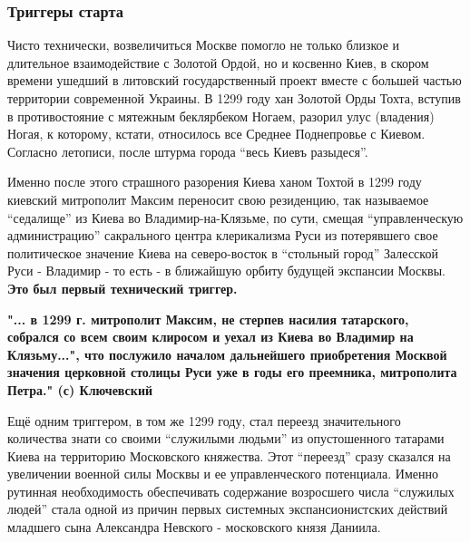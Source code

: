  
 
 
 
 

\subsubsection{Триггеры старта}
\label{sec:16_01_2022.stz.news.ua.hvylya.1.anatomia_vraga.2.triggery_starta}

Чисто технически, возвеличиться Москве помогло не только близкое и длительное
взаимодействие с Золотой Ордой, но и косвенно Киев, в скором времени ушедший в
литовский государственный проект вместе с большей частью территории современной
Украины. В 1299 году хан Золотой Орды Тохта, вступив в противостояние с
мятежным беклярбеком Ногаем, разорил улус (владения) Ногая, к которому, кстати,
относилось все Среднее Поднепровье с Киевом. Согласно летописи, после штурма
города \enquote{весь Киевъ разыдеся}.

Именно после этого страшного разорения Киева ханом Тохтой в 1299 году киевский
митрополит Максим переносит свою резиденцию, так называемое \enquote{седалище}
из Киева во Владимир-на-Клязьме, по сути, смещая \enquote{управленческую
администрацию} сакрального центра клерикализма Руси из потерявшего свое
политическое значение Киева на северо-восток в \enquote{стольный город}
Залесской Руси - Владимир - то есть - в ближайшую орбиту будущей экспансии
Москвы. \textbf{Это был первый технический триггер.}

\textbf{"... в 1299 г. митрополит Максим, не стерпев насилия татарского, собрался со всем
своим клиросом и уехал из Киева во Владимир на Клязьму...", что послужило началом
дальнейшего приобретения Москвой значения церковной столицы Руси уже в годы его
преемника, митрополита Петра." (с) Ключевский}

Ещё одним триггером, в том же 1299 году, стал переезд значительного количества
знати со своими \enquote{служилыми людьми} из опустошенного татарами Киева на
территорию Московского княжества. Этот \enquote{переезд} сразу сказался на увеличении
военной силы Москвы и ее управленческого потенциала. Именно рутинная
необходимость обеспечивать содержание возросшего числа \enquote{служилых людей} стала
одной из причин первых системных экспансионистских действий младшего сына
Александра Невского - московского князя Даниила.
